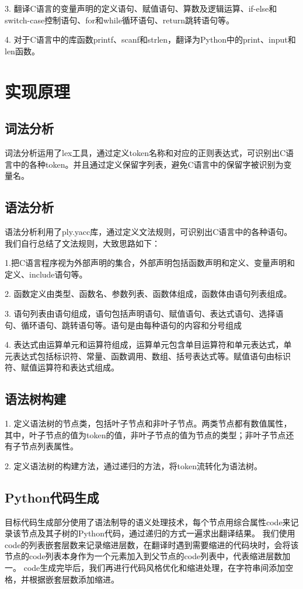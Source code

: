 \documentclass{article}
\begin{document}
3. 翻译C语言的变量声明的定义语句、赋值语句、算数及逻辑运算、if-else和switch-case控制语句、for和while循环语句、return跳转语句等。

4. 对于C语言中的库函数printf、scanf和strlen，翻译为Python中的print、input和len函数。


\section{实现原理}
\subsection{词法分析}
词法分析运用了lex工具，通过定义token名称和对应的正则表达式，可识别出C语言中的各种token。并且通过定义保留字列表，避免C语言中的保留字被识别为变量名。

\subsection{语法分析}
语法分析利用了ply.yacc库，通过定义文法规则，可识别出C语言中的各种语句。
我们自行总结了文法规则，大致思路如下：

1.把C语言程序视为外部声明的集合，外部声明包括函数声明和定义、变量声明和定义、include语句等。

2. 函数定义由类型、函数名、参数列表、函数体组成，函数体由语句列表组成。

3. 语句列表由语句组成，语句包括声明语句、赋值语句、表达式语句、选择语句、循环语句、跳转语句等。语句是由每种语句的内容和分号组成

4. 表达式由运算单元和运算符组成，运算单元包含单目运算符和单元表达式，单元表达式包括标识符、常量、函数调用、数组、括号表达式等。赋值语句由标识符、赋值运算符和表达式组成。


\subsection{语法树构建}
1. 定义语法树的节点类，包括叶子节点和非叶子节点。两类节点都有数值属性，其中，叶子节点的值为token的值，非叶子节点的值为节点的类型；非叶子节点还有子节点列表属性。

2. 定义语法树的构建方法，通过递归的方法，将token流转化为语法树。

\subsection{Python代码生成}
目标代码生成部分使用了语法制导的语义处理技术，每个节点用综合属性code来记录该节点及其子树的Python代码，通过递归的方式一遍求出翻译结果。
我们使用code的列表嵌套层数来记录缩进层数，在翻译时遇到需要缩进的代码块时，会将该节点的code列表本身作为一个元素加入到父节点的code列表中，代表缩进层数加一。
code生成完毕后，我们再进行代码风格优化和缩进处理，在字符串间添加空格，并根据嵌套层数添加缩进。
\end{document}
